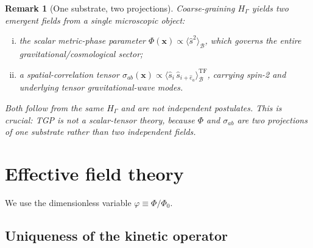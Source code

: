 \documentclass[11pt,a4paper]{article}
\renewcommand{\Phi}{\varPhi}
\newcommand{\PhiZero}{\varPhi_{0}}
\newtheorem{remark}[axiom]{Remark}
\begin{document}
\begin{remark}[One substrate, two projections]
Coarse-graining $H_{\Gamma}$ yields \emph{two} emergent fields from a
single microscopic object:
\begin{enumerate}[(i),nosep]
  \item the scalar metric-phase parameter
    $\Phi(\mathbf{x})\propto\langle\hat{s}^{2}\rangle_{\mathcal{B}}$,
    which governs the entire gravitational/cosmological sector;
  \item a spatial-correlation tensor
    $\sigma_{ab}(\mathbf{x})\propto
    \langle\hat{s}_{i}\,\hat{s}_{i+\hat{e}_{a}}\rangle_{\mathcal{B}}^{\mathrm{TF}}$,
    carrying spin-2 and underlying tensor gravitational-wave modes.
\end{enumerate}
Both follow from the \emph{same} $H_{\Gamma}$ and are not independent
postulates. This is crucial: TGP is not a scalar-tensor theory, because
$\Phi$ and $\sigma_{ab}$ are two projections of one substrate rather than
two independent fields.
\end{remark}

\section{Effective field theory}\label{sec:field}

We use the dimensionless variable $\varphi \equiv \Phi/\PhiZero$.

\subsection{Uniqueness of the kinetic operator}
\end{document}
